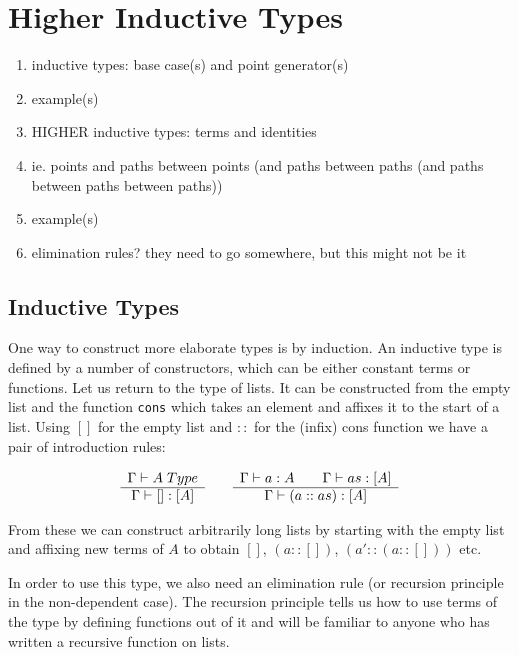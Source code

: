 \section{Higher Inductive Types}
\begin{enumerate}
  \item inductive types: base case(s) and point generator(s)
  \item example(s)
  \item HIGHER inductive types: terms and identities
  \item ie. points and paths between points (and paths between paths (and
    paths between paths between paths))
  \item example(s)
  \item elimination rules? they need to go somewhere, but this might not be it
\end{enumerate}

\subsection{Inductive Types}
One way to construct more elaborate types is by induction. An inductive type is
defined by a number of constructors, which can be either constant terms or
functions. Let us return to the type of lists. It can be constructed from the
empty list and the function \texttt{cons} which takes an element and affixes it
to the start of a list. Using $[]$ for the empty list and $::$ for the (infix)
cons function we have a pair of introduction rules:

\[
  \begin{array}[t]{c}
    \Gamma \vdash A \; Type\\
    \hline
    \Gamma \vdash [] : [A]\\
  \end{array}
  \qquad
  \begin{array}[t]{c}
    \Gamma \vdash a:A \qquad \Gamma \vdash as:[A] \\
    \hline
    \Gamma \vdash ( a :: as ) : [A]
  \end{array}
\]

From these we can construct arbitrarily long lists by starting with the empty
list and affixing new terms of $A$ to obtain $[]$, $(a::[])$, $(a'::(a::[]))$ etc.

In order to use this type, we also need an elimination rule (or
recursion principle in the non-dependent case). The recursion principle tells us
how to use terms of the type by defining functions out of it and will be
familiar to anyone who has written a recursive function on lists.

